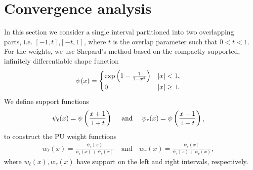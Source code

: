 \section{Convergence analysis}
\label{converge_sec}
In this section we consider a single interval partitioned into two overlapping parts, i.e.
$[-1,t]$,$[-t,1]$, where $t$ is the overlap parameter such that $0<t<1$. For the weights, we use Shepard's method \cite{shepard1968two} based on the compactly supported, infinitely differentiable shape function
\begin{align}
\psi(x) = \begin{cases}
\exp \left(  1 - \frac{1}{1-x^2}\right) & |x| < 1, \\
0 & |x| \geq 1.
\end{cases}
\end{align}
We define support functions
\begin{align}
\psi_{\ell}(x) = \psi \left( \frac{x+1}{1+t} \right) \quad \text{ and } \quad \psi_{r}(x) = \psi \left( \frac{x-1}{1+t} \right) ,
\end{align}
to construct the PU weight functions
\begin{align}
w_{\ell}(x) = \frac{\psi_{\ell}(x)}{\psi_{\ell}(x)+\psi_{r}(x)} \quad \text{and} \quad w_{r}(x) = \frac{\psi_{r}(x)}{\psi_{\ell}(x)+\psi_{r}(x)},
\label{PUW}
\end{align}
where $w_{\ell}(x),w_{r}(x)$ have support on the left and right intervals, respectively.

